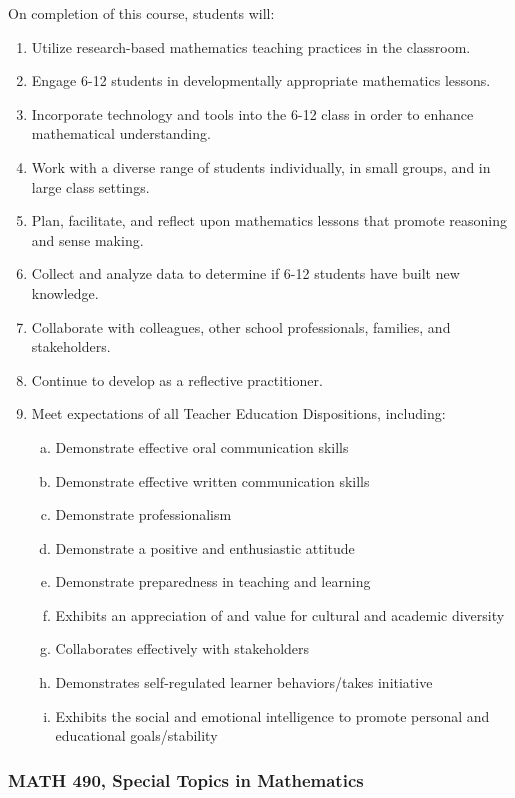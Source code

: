 \documentclass[11pt]{article}
\newenvironment{alphalist}{
  \begin{enumerate}[(1)]
    \addtolength{\itemsep}{-1.0\itemsep}}
  {\end{enumerate}}
\newenvironment{betalist}{
  \begin{enumerate}[(a)]
    \addtolength{\itemsep}{-1.0\itemsep}}
  {\end{enumerate}}
\begin{document}
On completion of this course, students will:
\begin{alphalist}
\item Utilize research-based mathematics teaching practices in the classroom.
\item Engage 6-12 students in developmentally appropriate mathematics lessons.
\item Incorporate technology and tools into the 6-12 class in order to enhance mathematical understanding.
\item Work with a diverse range of students individually, in small groups, and in large class settings.
\item Plan, facilitate, and reflect upon mathematics lessons that promote reasoning and sense making.
\item Collect and analyze data to determine if 6-12 students have built new knowledge. 
\item Collaborate with colleagues, other school professionals, families, and stakeholders.
\item Continue to develop as a reflective practitioner.
\item Meet expectations of all Teacher Education Dispositions, including:
\begin{betalist}
\item Demonstrate effective oral communication skills
\item Demonstrate effective written communication skills
\item Demonstrate professionalism
\item Demonstrate a positive and enthusiastic attitude
\item Demonstrate preparedness in teaching and learning
\item Exhibits an appreciation of and value for cultural and academic diversity
\item Collaborates effectively with stakeholders
\item Demonstrates self-regulated learner behaviors/takes initiative
\item Exhibits the social and emotional intelligence to promote personal and educational goals/stability
\end{betalist}
\end{alphalist}

\subsubsection*{MATH 490, Special Topics in Mathematics}
\end{document}
